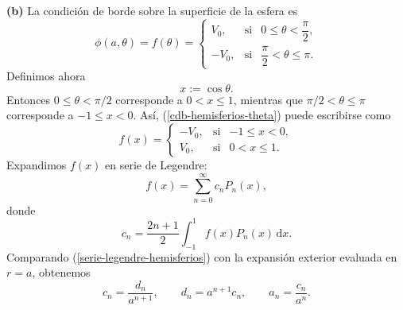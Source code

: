 \documentclass[11pt]{article}
\newcommand{\inciso}[1]{%
\vspace{0.35em}
\noindent\textbf{(#1)}\enspace}
\newcommand{\dd}{\,\mathrm{d}}
\begin{document}
\inciso{b} La condición de borde sobre la superficie de la esfera es
\begin{equation}
\label{cdb-hemisferios-theta}
\phi(a,\theta)=f(\theta)=
\left\{
\begin{array}{lcc}
 V_0, & \text{si} & 0\leq \theta < \dfrac{\pi}{2},\\[0.4em]
 -V_0, & \text{si} & \dfrac{\pi}{2}<\theta\leq \pi.
\end{array}
\right.
\end{equation}
Definimos ahora
\begin{equation*}
x:=\cos\theta.
\end{equation*}
Entonces $0\leq \theta <\pi/2$ corresponde a $0<x\leq1$, mientras que $\pi/2<\theta\leq\pi$ corresponde a $-1\leq x<0$. Así, (\ref{cdb-hemisferios-theta}) puede escribirse como
\begin{equation}
\label{cdb-hemisferios-x}
f(x)=
\left\{
\begin{array}{lcc}
 -V_0, & \text{si} & -1\leq x<0,\\
 V_0, & \text{si} & 0<x\leq 1.
\end{array}
\right.
\end{equation}
Expandimos $f(x)$ en serie de Legendre:
\begin{equation}
\label{serie-legendre-hemisferios}
f(x)=\sum_{n=0}^{\infty}c_nP_n(x),
\end{equation}
donde
\begin{equation}
\label{coeficiente-cn-hemisferios}
c_n=\frac{2n+1}{2}\int_{-1}^{1}f(x)P_n(x)\dd x.
\end{equation}
Comparando (\ref{serie-legendre-hemisferios}) con la expansión exterior evaluada en $r=a$, obtenemos
\begin{equation}
\label{coeficientes-a-d-c-hemisferios}
c_n=\frac{d_n}{a^{n+1}},
\qquad
 d_n=a^{n+1}c_n,
\qquad
 a_n=\frac{c_n}{a^n}.
\end{equation}
\end{document}
